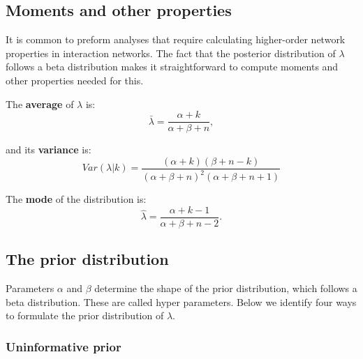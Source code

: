 \documentclass[12pt]{article}
\begin{document}
\begin{spacing}{2.0}


    \subsection*{Moments and other properties}

      It is common to preform analyses that require calculating higher-order network properties in interaction networks. The fact that the posterior distribution of $\lambda$ follows a beta distribution makes it straightforward to compute moments and other properties needed for this. 

      The \textbf{average} of $\lambda$ is: 
          \begin{equation}
            \bar{\lambda} = \frac{\alpha+k}{\alpha+\beta+n} ,
            \label{mean}
          \end{equation}

        and its \textbf{variance} is:  
          \begin{equation}
            Var(\lambda|k) = \frac{(\alpha + k)(\beta + n - k)}{(\alpha + \beta + n)^{2}(\alpha + \beta + n +1)}
            \label{variance}
          \end{equation}

        The \textbf{mode} of the distribution is:
          \begin{equation}
            \hat{\lambda} = \frac{\alpha + k - 1}{\alpha + \beta + n - 2} .
            \label{mode}
          \end{equation}

    \subsection*{The prior distribution}    

      Parameters $\alpha$ and $\beta$ determine the shape of the prior distribution, which follows a beta distribution. These are called hyper parameters. Below we identify four ways to formulate the prior distribution of $\lambda$. 

      \subsubsection*{Uninformative prior}
        

\end{spacing}
\end{document}
